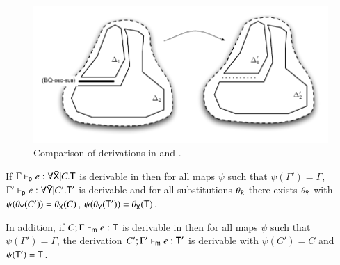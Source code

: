 \documentclass{report}
\begin{document}
  \begin{figure}[ht]
    \centering
    \includegraphics{images/BQsa_to_BQa}
    \caption{Comparison of derivations in \BQa and \BQa.}
  \end{figure}
  \begin{thm}
    If $\Gamma\vdash_\textsf{p} e:\forall\bar{\textsf{X}}|C.\textsf{T}$ is derivable in \BQa then
    for all maps $\psi$ such that $\psi(\Gamma')=\Gamma$,
    $\Gamma'\vdash_\textsf{p} e:\forall\bar{\textsf{Y}}|C'.\textsf{T}'$ is derivable
    and for all substitutions $\theta_{\bar{\textsf{X}}}$ there exists $\theta_{\bar{\textsf{Y}}}$
    with $\psi({\theta_{\bar{\textsf{Y}}}(C')})=\theta_{\bar{\textsf{X}}}(C)$,
    $\psi({\theta_{\bar{\textsf{Y}}}(\textsf{T}')})=\theta_{\bar{\textsf{X}}}(\textsf{T})$.
    
    In addition, if $C;\Gamma\vdash_\textsf{m} e:\textsf{T}$ is
    derivable in \BQa then for all maps $\psi$ such that $\psi(\Gamma')=\Gamma$, the
    derivation $C';\Gamma'\vdash_\textsf{m} e:\textsf{T}'$
    is derivable with $\psi(C')=C$ and $\psi(\textsf{T}')=\textsf{T}$.
  \end{thm}
\end{document}
